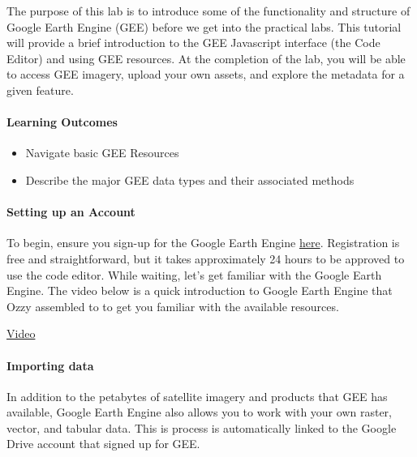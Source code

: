 \documentclass[
]{article}
\providecommand{\tightlist}{%
  \setlength{\itemsep}{0pt}\setlength{\parskip}{0pt}}
\begin{document}
The purpose of this lab is to introduce some of the functionality and structure of Google Earth Engine (GEE) before we get into the practical labs. This tutorial will provide a brief introduction to the GEE Javascript interface (the Code Editor) and using GEE resources. At the completion of the lab, you will be able to access GEE imagery, upload your own assets, and explore the metadata for a given feature.

\hypertarget{learning-outcomes}{%
\paragraph{Learning Outcomes}\label{learning-outcomes}}

\begin{itemize}
\tightlist
\item
  Navigate basic GEE Resources
\item
  Describe the major GEE data types and their associated methods
\end{itemize}

\hypertarget{setting-up-an-account}{%
\paragraph{Setting up an Account}\label{setting-up-an-account}}

To begin, ensure you sign-up for the Google Earth Engine \href{https://signup.earthengine.google.com}{here}. Registration is free and straightforward, but it takes approximately 24 hours to be approved to use the code editor. While waiting, let's get familiar with the Google Earth Engine. The video below is a quick introduction to Google Earth Engine that Ozzy assembled to to get you familiar with the available resources.

\href{https://www.youtube.com/watch?v=Ypo28T6wPbQ}{Video}

\hypertarget{importing-data}{%
\paragraph{Importing data}\label{importing-data}}

In addition to the petabytes of satellite imagery and products that GEE has available, Google Earth Engine also allows you to work with your own raster, vector, and tabular data.
This is process is automatically linked to the Google Drive account that signed up for GEE.
\end{document}
